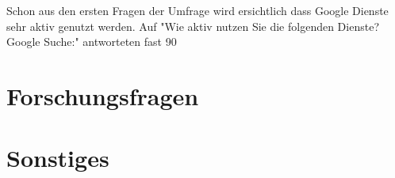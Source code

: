 Schon aus den ersten Fragen der Umfrage wird ersichtlich dass Google Dienste sehr aktiv genutzt werden. Auf "Wie aktiv nutzen Sie die folgenden Dienste? Google Suche:" antworteten fast 90%

\section{Forschungsfragen}

\section{Sonstiges}
